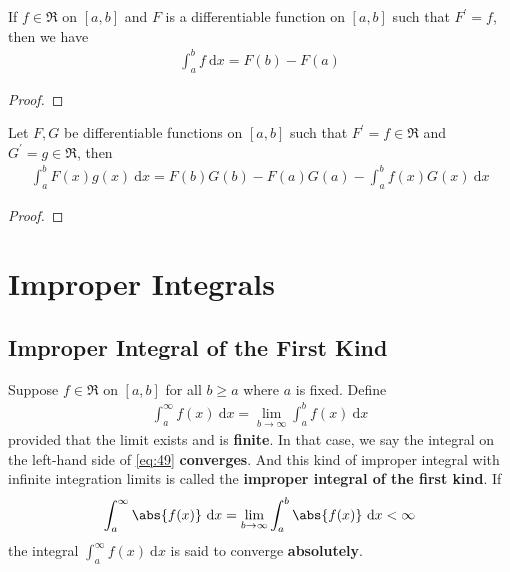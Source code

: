 \documentclass[thmcnt=section, 12pt]{elegantbook}
\begin{document}

\begin{theorem} \label{thm:1}
    If $ f \in \mathfrak{R} $ on $[a, b]$ and $F$ is a differentiable function on $[a, b]$ such that $F^\prime = f$, then we have
    \begin{align*}
        \int_a^b f \ \mathrm{d} x = F(b) - F(a)
    \end{align*}
\end{theorem}

\begin{proof}
\end{proof}


\begin{theorem} \label{thm:2}
    Let $F, G$ be differentiable functions on $[a, b]$ such that $F^\prime = f \in \mathfrak{R}$ and $G^\prime = g \in \mathfrak{R}$, then 
    \begin{align*}
        \int_a^b F(x)g(x) \ \mathrm{d} x = F(b)G(b) - F(a)G(a) - \int_a^b f(x)G(x) \ \mathrm{d} x
    \end{align*}
\end{theorem}

\begin{proof}
\end{proof}



\chapter{Improper Integrals}


\section{Improper Integral of the First Kind}


\begin{definition}
    Suppose $f \in \mathfrak{R}$ on $[a,b]$ for all $b \geq a$ where $a$ is fixed. Define 
    \begin{align}
        \int_a^\infty f(x) \ \mathrm{d}x
        = \lim_{b \to \infty} \int_a^b f(x) \ \mathrm{d}x
        \label{eq:49}
    \end{align}
    provided that the limit exists and is \textbf{finite}. In that case, we say the integral on the left-hand side of \eqref{eq:49} \textbf{converges}. And this kind of improper integral with infinite integration limits is called the \textbf{improper integral of the first kind}. If 
    \begin{align*}
        \int_a^\infty \abs{f(x)} \ \mathrm{d}x
        = \lim_{b \to \infty} \int_a^b \abs{f(x)} \ \mathrm{d}x
        < \infty
    \end{align*}
    the integral $\int_a^\infty f(x) \ \mathrm{d}x$ is said to converge \textbf{absolutely}.
\end{definition}
\end{document}
